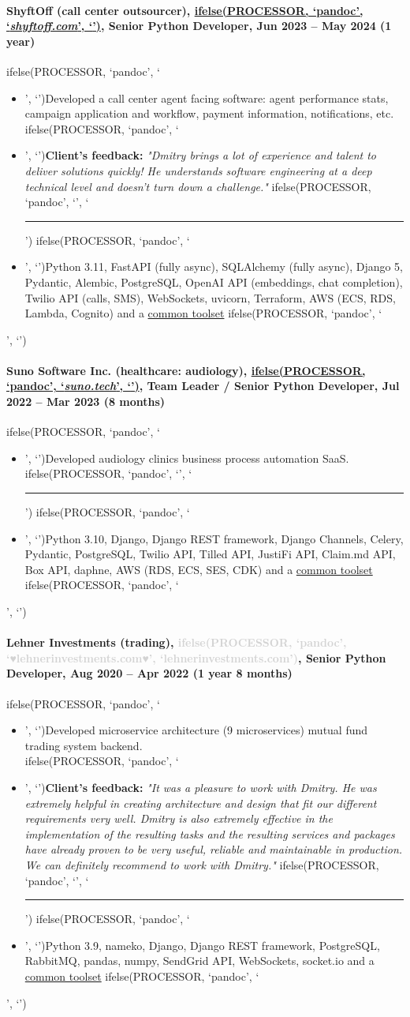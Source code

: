 \documentclass[a4paper,8pt]{extarticle}
\newcommand{\chref}[2]{\href{#1}
{ifelse(PROCESSOR, `pandoc', `#2', `\underline{\smash{#2}}')}}
\newcommand{\itchref}[2]{\chref{#1}{\textit{#2}}}  %
\newcommand{\chrule}{ifelse(PROCESSOR, `pandoc', `', `\vspace{3pt}\hrule')}
\newcommand{\brokenhreflg}[1]{\textcolor{lightgray}{ifelse(PROCESSOR, `pandoc', `♥#1♥', `#1')}}
\newcommand{\pdbeginitemize}{ifelse(PROCESSOR, `pandoc', `\begin{itemize}', `')}
\newcommand{\pditem}{ifelse(PROCESSOR, `pandoc', `\item', `')}
\newcommand{\pdenditemize}{ifelse(PROCESSOR, `pandoc', `\end{itemize}', `')}
\begin{document}
\paragraph*{ShyftOff (call center outsourcer), \itchref{https://shyftoff.com}{shyftoff.com}, Senior Python Developer, Jun 2023 -- May 2024 (1 year)}
\pdbeginitemize
\pditem Developed a call center agent facing software: agent performance stats, campaign application and workflow, payment information, notifications, etc.\\
\pditem \textbf{Client's feedback:} \textit{"Dmitry brings a lot of experience and talent to deliver solutions quickly! He understands software engineering at a deep technical level and doesn't turn down a challenge."}
\chrule
\pditem Python 3.11, FastAPI (fully async), SQLAlchemy (fully async), Django 5, Pydantic, Alembic, PostgreSQL, OpenAI API (embeddings, chat completion), Twilio API (calls, SMS), WebSockets, uvicorn, Terraform, AWS (ECS, RDS, Lambda, Cognito) and a \hyperlink{common-toolset}{common toolset}
\pdenditemize

\paragraph*{Suno Software Inc. (healthcare: audiology), \itchref{https://suno.tech}{suno.tech}, Team Leader / Senior Python Developer, Jul 2022 -- Mar 2023 (8 months)}
\pdbeginitemize
\pditem Developed audiology clinics business process automation SaaS.
\chrule
\pditem Python 3.10, Django, Django REST framework, Django Channels, Celery, Pydantic, PostgreSQL, Twilio API, Tilled API, JustiFi API, Claim.md API, Box API, daphne, AWS (RDS, ECS, SES, CDK) and a \hyperlink{common-toolset}{common toolset}
\pdenditemize

\paragraph*{Lehner Investments (trading), \brokenhreflg{lehnerinvestments.com}, \textbf{Senior Python Developer}, Aug 2020 -- Apr 2022 (1 year 8 months)}
\pdbeginitemize
\pditem Developed microservice architecture (9 microservices) mutual fund trading system backend.\\
\pditem \textbf{Client's feedback:} \textit{"It was a pleasure to work with Dmitry. He was extremely helpful in creating architecture and design that fit our different requirements very well. Dmitry is also extremely effective in the implementation of the resulting tasks and the resulting services and packages have already proven to be very useful, reliable and maintainable in production. We can definitely recommend to work with Dmitry."}
\chrule
\pditem Python 3.9, nameko, Django, Django REST framework, PostgreSQL, RabbitMQ, pandas, numpy, SendGrid API, WebSockets, socket.io and a \hyperlink{common-toolset}{common toolset}
\pdenditemize
\end{document}
